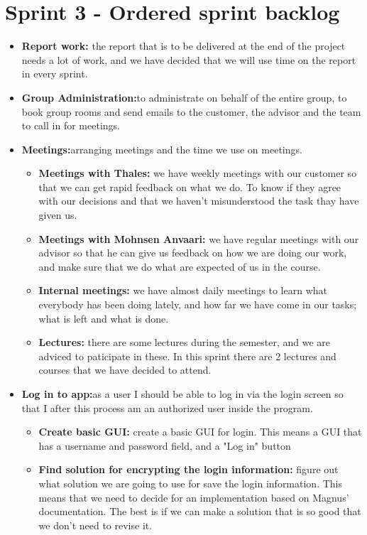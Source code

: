 

\section{Sprint 3 - Ordered sprint backlog}

\begin{itemize}
\item{}\textbf{Report work:} the report that is to be delivered at the end of the project needs a lot of work, and we have decided that we will use time on the report in every sprint.
\item{}\textbf{Group Administration:}to administrate on behalf of the entire group, to book group rooms and send emails to the customer, the advisor and the team to call in for meetings.
\item{}\textbf{Meetings:}arranging meetings and the time we use on meetings.
\begin{itemize}
\item{}\textbf{Meetings with Thales:} we have weekly meetings with our customer so that we can get rapid feedback on what we do. To know if they agree with our decisions and that we haven't misunderstood the task thay have given us.
\item{}\textbf{Meetings with Mohnsen Anvaari:} we have regular meetings with our advisor so that he can give us feedback on how we are doing our work, and make sure that we do what are expected of us in the course.
\item{}\textbf{Internal meetings:} we have almost daily meetings to learn what everybody has been doing lately, and how far we have come in our tasks; what is left and what is done.
\item{}\textbf{Lectures:} there are some lectures during the semester, and we are adviced to paticipate in these. In this sprint there are 2 lectures and courses that we have decided to attend.
\end{itemize}
\item{}\textbf{Log in to app:}as a user I should be able to log in via the login screen so that I after this process am an authorized user inside the program.
\begin{itemize}
\item{}\textbf{Create basic GUI:} create a basic GUI for login. This means a GUI that has a username and password field, and a "Log in" button
\item{}\textbf{Find solution for encrypting the login information:} figure out what solution we are going to use for save the login information. This means that we need to decide for an implementation based on Magnus' documentation. The best is if we can make a solution that is so good that we don’t need to revise it.

\end{itemize}
\end{itemize}
